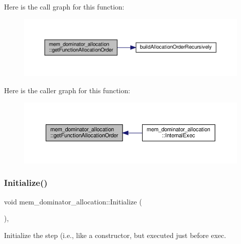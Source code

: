 Here is the call graph for this function\+:
\nopagebreak
\begin{figure}[H]
\begin{center}
\leavevmode
\includegraphics[width=350pt]{da/d83/classmem__dominator__allocation_a5cc28dbe6aa36df89b08e2673c636a64_cgraph}
\end{center}
\end{figure}
Here is the caller graph for this function\+:
\nopagebreak
\begin{figure}[H]
\begin{center}
\leavevmode
\includegraphics[width=350pt]{da/d83/classmem__dominator__allocation_a5cc28dbe6aa36df89b08e2673c636a64_icgraph}
\end{center}
\end{figure}
\mbox{\label{classmem__dominator__allocation_a742ee8ca37f2b4123e62b365fa524016}} 
\subsubsection{\texorpdfstring{Initialize()}{Initialize()}}
{\footnotesize\ttfamily void mem\+\_\+dominator\+\_\+allocation\+::\+Initialize (\begin{DoxyParamCaption}{ }\end{DoxyParamCaption})\hspace{0.3cm}{\ttfamily [override]}, {\ttfamily [virtual]}}



Initialize the step (i.\+e., like a constructor, but executed just before exec. 



